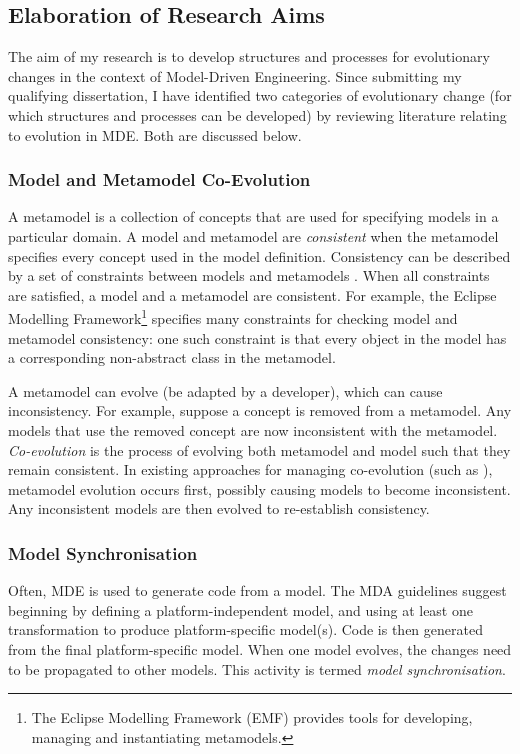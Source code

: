 \subsection{Elaboration of Research Aims}
\label{sub:elaboration}
The aim of my research is to develop structures and processes for evolutionary changes in the context of Model-Driven Engineering. Since submitting my qualifying dissertation, I have identified two categories of evolutionary change (for which structures and processes can be developed) by reviewing literature relating to evolution in MDE. Both are discussed below.

\subsubsection{Model and Metamodel Co-Evolution} %
\label{ssub:model_and_metamodel_co_evolution}
A metamodel is a collection of concepts that are used for specifying models in a particular domain. A model and metamodel are \emph{consistent} when the metamodel specifies every concept used in the model definition. Consistency can be described by a set of constraints between models and metamodels \cite{paige07metamodel}. When all constraints are satisfied, a model and a metamodel are consistent. For example, the Eclipse Modelling Framework\footnote{The Eclipse Modelling Framework (EMF) \cite{steinberg09emf} provides tools for developing, managing and instantiating metamodels.} specifies many constraints for checking model and metamodel consistency: one such constraint is that every object in the model has a corresponding non-abstract class in the metamodel.

A metamodel can evolve (be adapted by a developer), which can cause inconsistency. For example, suppose a concept is removed from a metamodel. Any models that use the removed concept are now inconsistent with the metamodel. \emph{Co-evolution} is the process of evolving both metamodel and model such that they remain consistent. In existing approaches for managing co-evolution (such as \cite{herrmannsdoerfer08cope,cicchetti08automating}), metamodel evolution occurs first, possibly causing models to become inconsistent. Any inconsistent models are then evolved to re-establish consistency.


\subsubsection{Model Synchronisation} %
\label{ssub:model_synchronisation}
Often, MDE is used to generate code from a model. The MDA guidelines suggest beginning by defining a platform-independent model, and using at least one transformation to produce platform-specific model(s). Code is then generated from the final platform-specific model. When one model evolves, the changes need to be propagated to other models. This activity is termed \textit{model synchronisation}.

